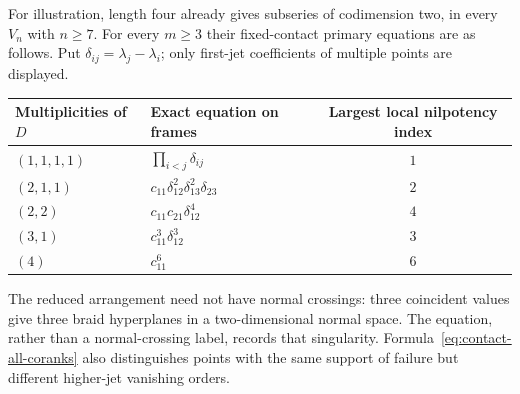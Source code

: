 For illustration, length four already gives subseries of codimension
two, in every $V_n$ with $n\ge7$. For every $m\ge3$ their fixed-contact
primary equations are as follows. Put $\delta_{ij}=\lambda_j-\lambda_i$;
only first-jet coefficients of multiple points are displayed.
\begin{center}
\begin{tabular}{@{}llc@{}}
\toprule
Multiplicities of $D$ & Exact equation on frames & Largest local nilpotency index\\
\midrule
$(1,1,1,1)$ & $\prod_{i<j}\delta_{ij}$ & $1$\\
$(2,1,1)$ & $c_{11}\delta_{12}^2\delta_{13}^2\delta_{23}$ & $2$\\
$(2,2)$ & $c_{11}c_{21}\delta_{12}^4$ & $4$\\
$(3,1)$ & $c_{11}^3\delta_{12}^3$ & $3$\\
$(4)$ & $c_{11}^6$ & $6$\\
\bottomrule
\end{tabular}
\end{center}
The reduced arrangement need not have normal crossings: three
coincident values give three braid hyperplanes in a two-dimensional
normal space. The equation, rather than a normal-crossing label,
records that singularity. Formula~\eqref{eq:contact-all-coranks}
also distinguishes points with the same support of failure but
different higher-jet vanishing orders.
